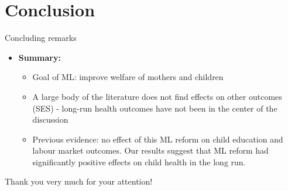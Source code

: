 \documentclass{beamer} %
\begin{document}
\section{Conclusion}
\begin{frame}{Concluding remarks}
\begin{itemize}
\item \textbf{Summary:}
\begin{itemize}
\item Goal of ML: improve welfare of mothers and children
\item A large body of the literature does not find effects on other outcomes (SES) - long-run health outcomes have not been in the center of the discussion

\item Previous evidence: no effect of this ML reform on child education and labour market outcomes.
Our results suggest that ML reform had significantly positive effects on child health in the long run.


\end{itemize}
\end{itemize}



\end{frame}




\begin{frame}
\begin{center}
Thank you very much for your attention!
\end{center}




\end{frame}
\end{document}
